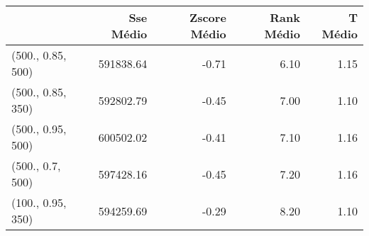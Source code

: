 \begin{table}
\centering
\label{tab:train_bests_Simulat}
\begin{tabular}{lrrrr}
\toprule
{} &  Sse Médio &  Zscore Médio &  Rank Médio &  T Médio \\
\midrule
(500., 0.85, 500) &  591838.64 &         -0.71 &        6.10 &     1.15 \\
(500., 0.85, 350) &  592802.79 &         -0.45 &        7.00 &     1.10 \\
(500., 0.95, 500) &  600502.02 &         -0.41 &        7.10 &     1.16 \\
(500., 0.7, 500)  &  597428.16 &         -0.45 &        7.20 &     1.16 \\
(100., 0.95, 350) &  594259.69 &         -0.29 &        8.20 &     1.10 \\
\bottomrule
\end{tabular}
\end{table}
